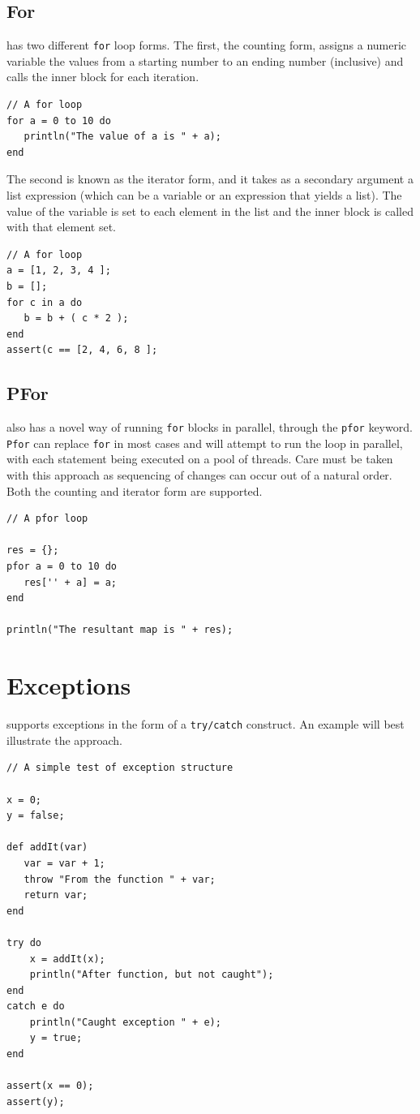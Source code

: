 \section{For}
\Reflex has two different \verb+for+ loop forms. The first, the counting form, assigns a numeric variable the values from a starting number to an ending number (inclusive) and calls the inner block for each iteration. 
\begin{lstlisting}[caption={For counting form}]
// A for loop
for a = 0 to 10 do
   println("The value of a is " + a);
end
\end{lstlisting}
The second is known as the iterator  form, and it takes as a secondary argument a list expression (which can be a variable or an expression that yields a list). The value of the variable is set to each element in the list and the inner block is called with that element set.
\begin{lstlisting}[caption={For iterator form}]
// A for loop
a = [1, 2, 3, 4 ];
b = [];
for c in a do
   b = b + ( c * 2 );
end
assert(c == [2, 4, 6, 8 ];
\end{lstlisting}
\section{PFor}
\Reflex also has a novel way of running \verb+for+ blocks in parallel, through the \verb+pfor+ keyword. \verb+Pfor+ can replace \verb+for+ in most cases and \Reflex will attempt to run the loop in parallel, with each statement being executed on a pool of threads. Care must be taken with this approach as sequencing of changes can occur out of a natural order. Both the counting and iterator form are supported.
\begin{lstlisting}[caption={PFor counting form}]
// A pfor loop

res = {};
pfor a = 0 to 10 do
   res['' + a] = a;
end

println("The resultant map is " + res);
\end{lstlisting}

\chapter{Exceptions}
\Reflex supports exceptions in the form of a \verb+try/catch+ construct. An example will best illustrate the approach.
\begin{lstlisting}[caption={Exception handling}]
// A simple test of exception structure

x = 0;
y = false;

def addIt(var)
   var = var + 1;
   throw "From the function " + var;
   return var;
end

try do
    x = addIt(x);
    println("After function, but not caught");
end
catch e do
    println("Caught exception " + e);
    y = true;
end

assert(x == 0);
assert(y);

\end{lstlisting}

